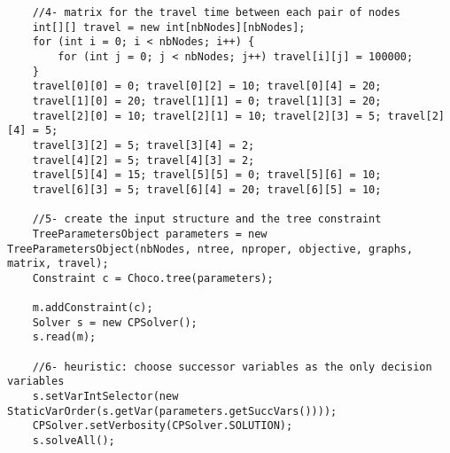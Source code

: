\begin{lstlisting}
	//4- matrix for the travel time between each pair of nodes
	int[][] travel = new int[nbNodes][nbNodes];
	for (int i = 0; i < nbNodes; i++) {
	    for (int j = 0; j < nbNodes; j++) travel[i][j] = 100000;
	}
	travel[0][0] = 0; travel[0][2] = 10; travel[0][4] = 20;
	travel[1][0] = 20; travel[1][1] = 0; travel[1][3] = 20;
	travel[2][0] = 10; travel[2][1] = 10; travel[2][3] = 5; travel[2][4] = 5;
	travel[3][2] = 5; travel[3][4] = 2;
	travel[4][2] = 5; travel[4][3] = 2;
	travel[5][4] = 15; travel[5][5] = 0; travel[5][6] = 10;
	travel[6][3] = 5; travel[6][4] = 20; travel[6][5] = 10;

	//5- create the input structure and the tree constraint
	TreeParametersObject parameters = new TreeParametersObject(nbNodes, ntree, nproper, objective, graphs, matrix, travel);
	Constraint c = Choco.tree(parameters);

	m.addConstraint(c);
	Solver s = new CPSolver();
	s.read(m);
	
	//6- heuristic: choose successor variables as the only decision variables
	s.setVarIntSelector(new StaticVarOrder(s.getVar(parameters.getSuccVars())));
	CPSolver.setVerbosity(CPSolver.SOLUTION);
	s.solveAll();
\end{lstlisting} 

